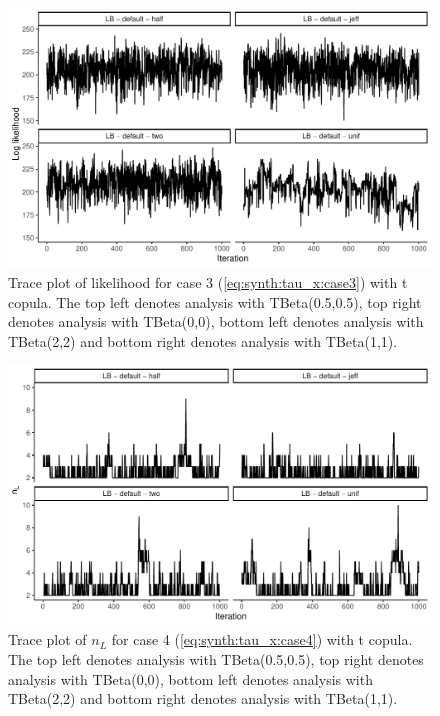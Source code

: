 \documentclass{amsart}
\begin{document}
\begin{figure}
	\centering
	\includegraphics[width = 0.75\linewidth]{trace_case3_t_like.pdf}
	\caption{Trace plot of likelihood for case 3 (\cref{eq:synth:tau_x:case3}) with t copula. The top left denotes analysis with TBeta(0.5,0.5), top right denotes analysis with TBeta(0,0), bottom left denotes analysis with TBeta(2,2) and bottom right denotes analysis with TBeta(1,1).}
	\label{fig:case3:t:like}
\end{figure}

\begin{figure}
	\centering
	\includegraphics[width = 0.75\linewidth]{trace_case4_t_nterm.pdf}
	\caption{Trace plot of $n_L$ for case 4 (\cref{eq:synth:tau_x:case4}) with t copula. The top left denotes analysis with TBeta(0.5,0.5), top right denotes analysis with TBeta(0,0), bottom left denotes analysis with TBeta(2,2) and bottom right denotes analysis with TBeta(1,1).}
	\label{fig:case4:t:nterm}
\end{figure}
\end{document}
